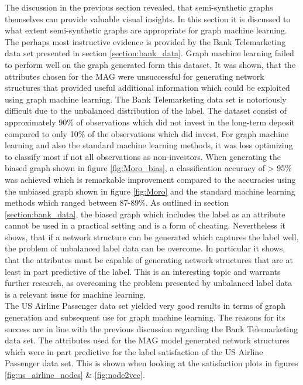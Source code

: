   The discussion in the previous section revealed, that semi-synthetic graphs
  themselves can provide valuable visual insights. In this section it is
  discussed to what extent semi-synthetic graphs are appropriate for graph
  machine learning. The perhaps most instructive evidence is provided by the Bank
  Telemarketing data set presented in section \ref{section:bank_data}. Graph
  machine learning failed to perform well on the graph generated form this
  dataset. It was shown, that the attributes chosen for the MAG were
  unsuccessful for generating network structures that provided useful additional
  information which could be exploited using graph machine learning. The Bank
  Telemarketing data set is notoriously difficult due to the unbalanced
  distribution of the label. The dataset consist of approximately 90\% of
  observations which did not invest in the long-term deposit compared to only 
  10\% of the observations which did invest. For graph machine learning and
  also the standard machine learning methods, it was loss optimizing to
  classify most if not all observations as non-investors. When generating the
  biased graph shown in figure \ref{fig:Moro_bias}, a classification accuracy
  of > 95\% was achieved which is remarkable improvement compared to the
  accuracies using the unbiased graph shown in figure \ref{fig:Moro} and the
  standard machine learning methods which ranged between 87-89\%. As outlined
  in section \ref{section:bank_data}, the biased graph which includes the label
  as an attribute cannot be used in a practical setting and is a form of
  cheating. Nevertheless it shows, that if a network structure can be generated
  which captures the label well, the problem of unbalanced label data can be
  overcome. In particular it shows, that the attributes must be capable of
  generating network structures that are at least in part predictive of the
  label. This is an interesting topic and warrants further research, as
  overcoming the problem presented by unbalanced label data is a relevant issue
  for machine learning. \\

  \noindent The US Airline Passenger data set yielded very good results in
  terms of graph generation and subsequent use for graph machine learning. The 
  reasons for its success are in line with the previous discussion regarding
  the Bank Telemarketing data set. The attributes used for the MAG model
  generated network structures which were in part predictive for the label
  satisfaction of the US Airline Passenger data set. This is shown when looking
  at the satisfaction plots in figures \ref{fig:us_airline_nodes} \&
  \ref{fig:node2vec}. \\ 

